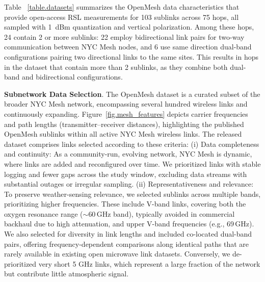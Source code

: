 \documentclass[manuscript]{copernicus}
\begin{document}
Table ~\ref{table.datasets} summarizes the OpenMesh data characteristics that provide open-access RSL measurements for 103 sublinks across 75 hops, all sampled with 1~dBm quantization and vertical polarization. Among these hops, 24 contain 2 or more sublinks: 22 employ bidirectional link pairs for two-way communication between NYC Mesh nodes, and 6 use same direction dual-band configurations pairing two directional links to the same sites. This results in hops in the dataset that contain more than 2 sublinks, as they combine both dual-band and bidirectional configurations.


\textbf{Subnetwork Data Selection}. 
The OpenMesh dataset is a curated subset of the broader NYC Mesh network, encompassing several hundred wireless links and continuously expanding. Figure~\ref{fig.mesh_features} depicts carrier frequencies and path lengths (transmitter–receiver distances), highlighting the published OpenMesh sublinks within all active NYC Mesh wireless links. 
The released dataset comprises links selected according to these criteria:
(i) Data completeness and continuity: As a community-run, evolving network, NYC Mesh is dynamic, where links are added and reconfigured over time. We prioritized links with stable logging and fewer gaps across the study window, excluding data streams with substantial outages or irregular sampling.
(ii) Representativeness and relevance: To preserve weather-sensing relevance, 
we selected sublinks across multiple bands, prioritizing higher frequencies. 
These include V-band links, covering both the oxygen resonance range 
($\sim$60\,GHz band), typically avoided in commercial backhaul due to high 
attenuation, and upper V-band frequencies (e.g., 69\,GHz). We also selected 
for diversity in link lengths and included co-located dual-band pairs, offering 
frequency-dependent comparisons along identical paths that are rarely available 
in existing open microwave link datasets. Conversely, we de-prioritized very 
short 5 GHz links, which represent a large fraction of the network but 
contribute little atmospheric signal.
\end{document}
